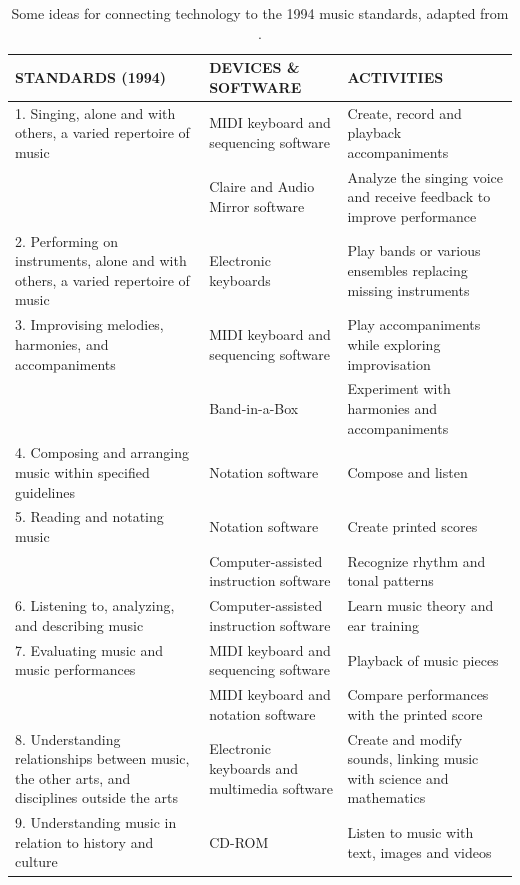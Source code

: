 \documentclass[journal]{IEEEtran}
\begin{document}
\begin{table}[htbp]
	\caption{Some ideas for connecting technology to the 1994 music standards, adapted from %
		\cite{rudolph2004teaching}.}
	\label{tab:rudolph}
	\centering
	\begin{tabular}{p{}p{}p{}}\\
		STANDARDS (1994) & DEVICES \& SOFTWARE & ACTIVITIES\\
		\hline\noalign{\smallskip}
		1. Singing, alone and with others, a varied repertoire of music & MIDI keyboard and sequencing software & Create, record and playback accompaniments\\
		& Claire and Audio Mirror software & Analyze the singing voice and receive feedback to improve performance
		\\
		\hline\noalign{\smallskip}
		2. Performing on instruments, alone and with others, a varied
		repertoire of music & Electronic keyboards & Play bands or various ensembles replacing missing instruments\\
		
		\hline\noalign{\smallskip}
		3. Improvising melodies, harmonies, and accompaniments & MIDI keyboard and sequencing software & Play accompaniments while exploring improvisation \\
		& Band-in-a-Box & Experiment with harmonies and accompaniments\\
		\hline\noalign{\smallskip}
		
		4. Composing and arranging music within specified guidelines & Notation software & Compose and listen\\
		
		\hline\noalign{\smallskip}
		5. Reading and notating music & Notation software & Create printed scores
		\\& Computer-assisted instruction software & Recognize rhythm and tonal patterns\\
		
		\hline\noalign{\smallskip}
		6. Listening to, analyzing, and describing music & Computer-assisted instruction software & Learn music theory and ear training\\
		
		\hline\noalign{\smallskip}
		7. Evaluating music and music performances & MIDI keyboard and sequencing software & Playback of music pieces\\

		& MIDI keyboard and notation software & Compare performances with the printed score\\
		
		\hline\noalign{\smallskip}
		8. Understanding relationships between music, the other arts,
		and disciplines outside the arts & Electronic keyboards and multimedia software & Create and modify sounds, linking music with science and mathematics\\
		
		\hline\noalign{\smallskip}
		9. Understanding music in relation to history and culture & CD-ROM & Listen to music with text, images and videos\\
	\end{tabular}
\end{table}
\end{document}
